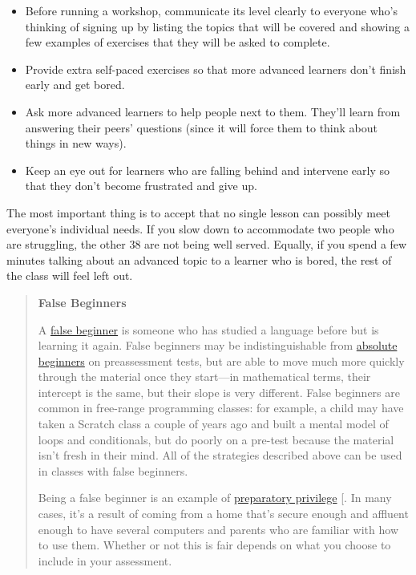 \begin{itemize}
\item
  Before running a workshop, communicate its level clearly to everyone
  who's thinking of signing up by listing the topics that will be
  covered and showing a few examples of exercises that they will be
  asked to complete.
\item
  Provide extra self-paced exercises so that more advanced learners
  don't finish early and get bored.
\item
  Ask more advanced learners to help people next to them. They'll
  learn from answering their peers' questions (since it will force
  them to think about things in new ways).
\item
  Keep an eye out for learners who are falling behind and intervene
  early so that they don't become frustrated and give up.
\end{itemize}

The most important thing is to accept that no single lesson can possibly
meet everyone's individual needs. If you slow down to accommodate two
people who are struggling, the other 38 are not being well served.
Equally, if you spend a few minutes talking about an advanced topic to a
learner who is bored, the rest of the class will feel left out.

\begin{quote}\setlength{\parindent}{0pt}
\textbf{False Beginners}

A \protect\hyperlink{g:false-beginner}{false beginner} is someone who has
studied a language before but is learning it again. False beginners
may be indistinguishable from
\protect\hyperlink{g:absolute-beginner}{absolute beginners} on preassessment
tests, but are able to move much more quickly through the material
once they start---in mathematical terms, their intercept is the same,
but their slope is very different. False beginners are common in
free-range programming classes: for example, a child may have taken a
Scratch class a couple of years ago and built a mental model of loops
and conditionals, but do poorly on a pre-test because the material
isn't fresh in their mind. All of the strategies described above can
be used in classes with false beginners.

Being a false beginner is an example of
\protect\hyperlink{g:preparatory-privilege}{preparatory privilege}
{[}\protect[\hyperlink{b:Marg2010}{Marg2010}]{]}. In many cases, it's a result of coming from a home
that's secure enough and affluent enough to have several computers and
parents who are familiar with how to use them. Whether or not this is
fair depends on what you choose to include in your assessment.
\end{quote}


